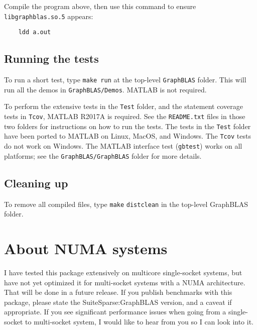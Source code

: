 \documentclass[12pt]{article}
\begin{document}
Compile the program above, then use this command to ensure
\verb'libgraphblas.so.5' appears:

    {\small
    \begin{verbatim}
    ldd a.out \end{verbatim} }

\subsection{Running the tests}

To run a short test, type \verb'make run' at the top-level \verb'GraphBLAS'
folder.  This will run all the demos in \verb'GraphBLAS/Demos'.  MATLAB is not
required.

To perform the extensive tests in the \verb'Test' folder, and the statement
coverage tests in \verb'Tcov', MATLAB R2017A is required.  See the
\verb'README.txt' files in those two folders for instructions on how to run the
tests.  The tests in the \verb'Test' folder have been ported to MATLAB on
Linux, MacOS, and Windows.  The \verb'Tcov' tests do not work on Windows.  The
MATLAB interface test (\verb'gbtest') works on all platforms; see the
\verb'GraphBLAS/GraphBLAS' folder for more details.

\subsection{Cleaning up}

To remove all compiled files, type \verb'make' \verb'distclean' in the top-level
GraphBLAS folder.

\section{About NUMA systems}

I have tested this package extensively on multicore single-socket systems, but
have not yet optimized it for multi-socket systems with a NUMA architecture.
That will be done in a future release.  If you publish benchmarks
with this package, please state the SuiteSparse:GraphBLAS version, and a caveat
if appropriate.  If you see significant performance issues when going from a
single-socket to multi-socket system, I would like to hear from you so I can
look into it.
\end{document}

